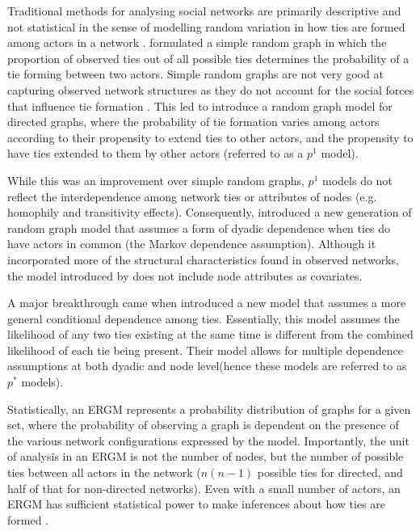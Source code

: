 Traditional methods for analysing social networks are primarily descriptive and not statistical in the sense of modelling random variation in how ties are formed among actors in a network \citep{harris2013introduction}. \citet{erdos1959random} formulated a simple random graph in which the proportion of observed ties out of all possible ties determines the probability of a tie forming between two actors. Simple random graphs are not very good at capturing observed network structures as they do not account for the social forces that influence tie formation \citep{harris2013introduction}. This led \citet{holland1981exponential} to introduce a random graph model for directed graphs, where the probability of tie formation varies among actors according to their propensity to extend ties to other actors, and the propensity to have ties extended to them by other actors (referred to as a $p^1$ model). \medskip

While this was an improvement over simple random graphs, $p^1$ models do not reflect the interdependence among network ties or attributes of nodes (e.g. homophily and transitivity effects). Consequently, \citet{frank1986markov} introduced a new generation of random graph model that assumes a form of dyadic dependence when ties do have actors in common (the Markov dependence assumption). Although it incorporated more of the structural characteristics found in observed networks, the model introduced by \citet{frank1986markov} does not include node attributes as covariates. \medskip

A major breakthrough came when \citet{wasserman1996logit} introduced a new model that assumes a more general conditional dependence among ties. Essentially, this model assumes the likelihood of any two ties existing at the same time is different from the combined likelihood of each tie being present. Their model allows for multiple dependence assumptions at both dyadic and node level(hence these models are referred to as $p^*$ models). \medskip

Statistically, an ERGM represents a probability distribution of graphs for a given set, where the probability of observing a graph is dependent on the presence of the various network configurations expressed by the model. Importantly, the unit of analysis in an ERGM is not the number of nodes, but the number of possible ties between all actors in the network ($n(n-1)$ possible ties for directed, and half of that for non-directed networks). Even with a small number of actors, an ERGM has sufficient statistical power to make inferences about how ties are formed \citep{lusher2013exponential}. \medskip

